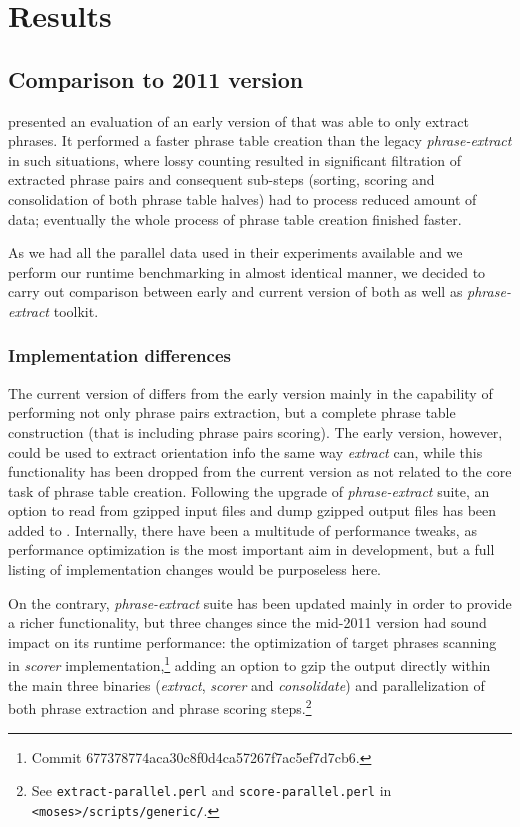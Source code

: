 \chapter{Results}
\label{chap:results}

\section{Comparison to 2011 version}

\citet{przywara:eppex} presented an evaluation of an early version of \eppex{}
that was able to only extract phrases. It performed a faster phrase
table creation than the legacy \emph{phrase-extract} in such situations,
where lossy counting resulted in significant filtration of extracted phrase
pairs and consequent sub-steps (sorting, scoring and consolidation of both
phrase table halves) had to process reduced amount of data;
eventually the whole process of phrase table creation finished faster.

As we had all the parallel data used in their experiments available and
we perform our runtime benchmarking in almost identical manner,
we decided to carry out comparison between early and current version of
both \eppex{} as well as \emph{phrase-extract} toolkit.

\subsection{Implementation differences}

The current version of \eppex{} differs from the early version mainly in the
capability of performing not only phrase pairs extraction, but a complete
phrase table construction (that is including phrase pairs scoring).
The early version, however, could be used to extract orientation info
the same way \emph{extract} can, while this functionality has been dropped
from the current version as not related to the core task of phrase table creation.
Following the upgrade of \emph{phrase-extract} suite, an option to read from
gzipped input files and dump gzipped output files has been added to \eppex{}.
Internally, there have been a multitude of performance tweaks,
as performance optimization is the most important aim in \eppex{} development,
but a full listing of implementation changes would be purposeless here.

On the contrary, \emph{phrase-extract} suite has been updated mainly in order to
provide a richer functionality, but three changes since the mid-2011 version
had sound impact on its runtime performance: the optimization of target phrases
scanning in \emph{scorer} implementation,\footnote{Commit 677378774aca30c8f0d4ca57267f7ac5ef7d7cb6.}
adding an option to gzip the output directly within the main three binaries
(\emph{extract}, \emph{scorer} and \emph{consolidate})
and parallelization of both phrase extraction and phrase scoring
steps.\footnote{See \texttt{extract-parallel.perl} and \texttt{score-parallel.perl}
in \texttt{<moses>/scripts/generic/}.}

